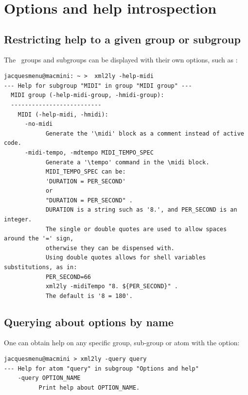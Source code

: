 \chapter{Options and help introspection}

\section{Restricting help to a given group or subgroup}

The \oahRepr\ groups and subgroups can be displayed with their own options, such as :
\begin{lstlisting}[language=Terminal]
jacquesmenu@macmini: ~ >  xml2ly -help-midi
--- Help for subgroup "MIDI" in group "MIDI group" ---
  MIDI group (-help-midi-group, -hmidi-group):
  --------------------------
    MIDI (-help-midi, -hmidi):
      -no-midi
            Generate the '\midi' block as a comment instead of active code.
      -midi-tempo, -mdtempo MIDI_TEMPO_SPEC
            Generate a '\tempo' command in the \midi block.
            MIDI_TEMPO_SPEC can be:
            'DURATION = PER_SECOND'
            or
            "DURATION = PER_SECOND" .
            DURATION is a string such as '8.', and PER_SECOND is an integer.
            The single or double quotes are used to allow spaces around the '=' sign,
            otherwise they can be dispensed with.
            Using double quotes allows for shell variables substitutions, as in:
            PER_SECOND=66
            xml2ly -midiTempo "8. ${PER_SECOND}" .
            The default is '8 = 180'.
\end{lstlisting}


\section{Querying about options by name}\label{Querying about options by name}

One can obtain help on any specific group, sub-group or atom with the  option:
\begin{lstlisting}[language=Terminal]
jacquesmenu@macmini > xml2ly -query query
--- Help for atom "query" in subgroup "Options and help"
    -query OPTION_NAME
          Print help about OPTION_NAME.
\end{lstlisting}

